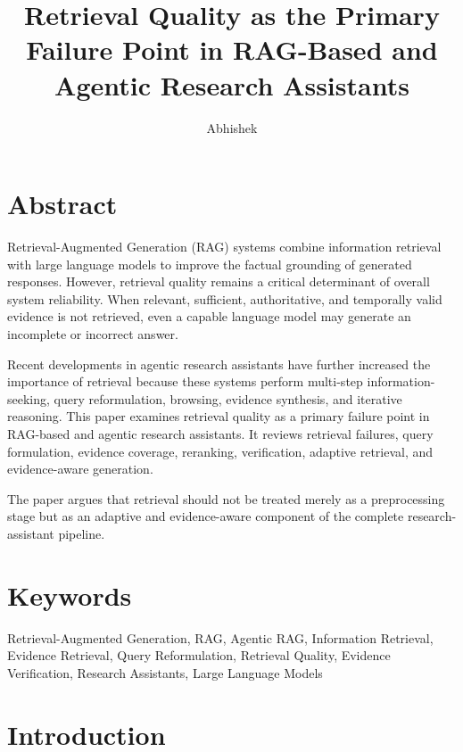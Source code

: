 \documentclass[12pt,a4paper]{article}
\title{
    Retrieval Quality as the Primary Failure Point in RAG-Based and Agentic Research Assistants
}
\author{Abhishek}
\date{}
\begin{document}
\maketitle

\section{Abstract}

Retrieval-Augmented Generation (RAG) systems combine information retrieval
with large language models to improve the factual grounding of generated
responses. However, retrieval quality remains a critical determinant of
overall system reliability. When relevant, sufficient, authoritative, and
temporally valid evidence is not retrieved, even a capable language model
may generate an incomplete or incorrect answer.

Recent developments in agentic research assistants have further increased
the importance of retrieval because these systems perform multi-step
information-seeking, query reformulation, browsing, evidence synthesis,
and iterative reasoning. This paper examines retrieval quality as a primary
failure point in RAG-based and agentic research assistants. It reviews
retrieval failures, query formulation, evidence coverage, reranking,
verification, adaptive retrieval, and evidence-aware generation.

The paper argues that retrieval should not be treated merely as a
preprocessing stage but as an adaptive and evidence-aware component of the
complete research-assistant pipeline.

\section{Keywords}

Retrieval-Augmented Generation, RAG, Agentic RAG, Information Retrieval,
Evidence Retrieval, Query Reformulation, Retrieval Quality, Evidence
Verification, Research Assistants, Large Language Models

\section{Introduction}
\label{sec:introduction}
\end{document}
